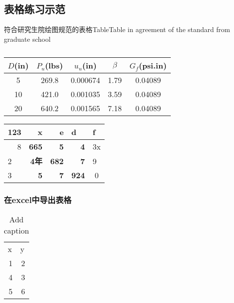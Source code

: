 \documentclass[UTF8]{ctexbook}
\begin{document}
\subsection{表格练习示范}
\begin{table}[htbp]
	\caption[table1]{}{符合研究生院绘图规范的表格}{Table$\!$}{Table in agreement of the standard from graduate school}
	\\
	\vspace{0.5em}\centering
	\begin{tabular}{ccccc}
		\toprule[1.5pt]
		$D$(in) & $P_u$(lbs) & $u_u$(in) & $\beta$ & $G_f$(psi.in)\\
		\midrule[1pt]
		5 & 269.8 & 0.000674 & 1.79 & 0.04089\\
		10 & 421.0 & 0.001035 & 3.59 & 0.04089\\
		20 & 640.2 & 0.001565 & 7.18 & 0.04089\\
		\bottomrule[1.5pt]
	\end{tabular}
\end{table}
\begin{table}[]
	\begin{tabular}{|l|r|r|r|l|}
		\hline
		123                     & x            & e            & \multicolumn{1}{l|}{d} & f                      \\ \hline
		\multicolumn{1}{|r|}{8} & \textbf{665} & \textbf{5}   & \textbf{4}             & 3x                     \\ \hline
		2                       & \textbf{4年}  & \textbf{682} & \textbf{7}             & 9                      \\ \hline
		3                       & \textbf{5}   & \textbf{7}   & \textbf{924}           & \multicolumn{1}{c|}{0} \\ \hline
	\end{tabular}
\end{table}

\subsubsection{在excel中导出表格}
\begin{table}[htbp]
	\centering
	\caption{Add caption}
	\begin{tabular}{rr}
		\multicolumn{1}{l}{x} & \multicolumn{1}{l}{y} \\
		1     & 2 \\
		4     & 3 \\
		5     & 6 \\
	\end{tabular}%
	\label{tab:addlabel}%
\end{table}%
\newpage
\end{document}
